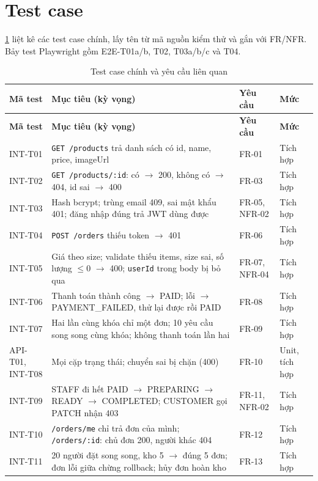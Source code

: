 \section{Test case}\label{sec:se-testcase}
\cref{tab:testcase} liệt kê các test case chính, lấy tên từ mã nguồn kiểm thử và gắn với FR/NFR. Bảy test Playwright gồm E2E-T01a/b, T02, T03a/b/c và T04.
{\small
\begin{longtable}{@{}p{1.6cm}p{6.4cm}p{1.7cm}p{3.4cm}@{}}
\caption{Test case chính và yêu cầu liên quan}\label{tab:testcase}\\
\toprule \textbf{Mã test} & \textbf{Mục tiêu (kỳ vọng)} & \textbf{Yêu cầu} & \textbf{Mức} \\ \midrule \endfirsthead
\toprule \textbf{Mã test} & \textbf{Mục tiêu (kỳ vọng)} & \textbf{Yêu cầu} & \textbf{Mức} \\ \midrule \endhead
\bottomrule \endlastfoot
INT-T01 & \texttt{GET /products} trả danh sách có id, name, price, imageUrl & FR-01 & Tích hợp \\
INT-T02 & \texttt{GET /products/:id}: có $\to$ 200, không có $\to$ 404, id sai $\to$ 400 & FR-03 & Tích hợp \\
INT-T03 & Hash bcrypt; trùng email 409, sai mật khẩu 401; đăng nhập đúng trả JWT dùng được & FR-05, NFR-02 & Tích hợp \\
INT-T04 & \texttt{POST /orders} thiếu token $\to$ 401 & FR-06 & Tích hợp \\
INT-T05 & Giá theo size; validate thiếu items, size sai, số lượng $\leq 0$ $\to$ 400; \texttt{userId} trong body bị bỏ qua & FR-07, NFR-04 & Tích hợp \\
INT-T06 & Thanh toán thành công $\to$ PAID; lỗi $\to$ PAYMENT\_FAILED, thử lại được rồi PAID & FR-08 & Tích hợp \\
INT-T07 & Hai lần cùng khóa chỉ một đơn; 10 yêu cầu song song cùng khóa; không thanh toán lần hai & FR-09 & Tích hợp \\
API-T01, INT-T08 & Mọi cặp trạng thái; chuyển sai bị chặn (400) & FR-10 & Unit, tích hợp \\
INT-T09 & STAFF đi hết PAID $\to$ PREPARING $\to$ READY $\to$ COMPLETED; CUSTOMER gọi PATCH nhận 403 & FR-11, NFR-02 & Tích hợp \\
INT-T10 & \texttt{/orders/me} chỉ trả đơn của mình; \texttt{/orders/:id}: chủ đơn 200, người khác 404 & FR-12 & Tích hợp \\
INT-T11 & 20 người đặt song song, kho 5 $\to$ đúng 5 đơn; đơn lỗi giữa chừng rollback; hủy đơn hoàn kho & FR-13 & Tích hợp \\

\end{longtable}}
